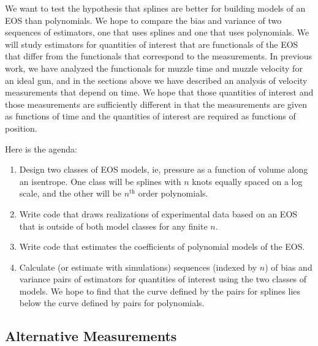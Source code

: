 \documentclass[11pt]{article}
\begin{document}
We want to test the hypothesis that splines are better for building
models of an EOS than polynomials.  We hope to compare the bias and
variance of two sequences of estimators, one that uses splines and one
that uses polynomials.  We will study estimators for quantities of
interest that are functionals of the EOS that differ from the
functionals that correspond to the measurements.  In previous work, we
have analyzed the functionals for muzzle time and muzzle velocity for
an ideal gun, and in the sections above we have described an analysis
of velocity measurements that depend on time.  We hope that those
quantities of interest and those measurements are sufficiently
different in that the measurements are given as functions of time and
the quantities of interest are required as functions of position.

Here is the agenda:
\begin{enumerate}
\item Design two classes of EOS models, ie, pressure as a function of
  volume along an isentrope.  One class will be splines with $n$ knots
  equally spaced on a log scale, and the other will be $n^{\text{th}}$
  order polynomials.
\item Write code that draws realizations of experimental data based on
  an EOS that is outside of both model classes for any finite $n$.
\item Write code that estimates the coefficients of polynomial models
  of the EOS.
\item Calculate (or estimate with simulations) sequences (indexed by
  $n$) of bias and variance pairs of estimators for quantities of
  interest using the two classes of models.  We hope to find that the
  curve defined by the pairs for splines lies below the curve defined
  by pairs for polynomials.
\end{enumerate}

\subsection{Alternative Measurements}
\label{sec:alternative}
\end{document}

